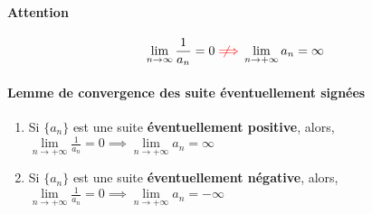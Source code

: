 \documentclass{report}
\newcommand{\notimplies}{%
  \mathrel{{\ooalign{\hidewidth$\not\phantom{=}$\hidewidth\cr$\implies$}}}}
\begin{document}
\begin{multicols*}{3}
    \paragraph{Attention}
        \begin{align*}
            \lim\limits_{n\to\infty  }\frac{1}{a_n} = 0 
            \textcolor{red}{\notimplies}
            \lim\limits_{n\to+\infty }a_n  = \infty
        \end{align*}    

    \paragraph{Lemme de convergence des suite éventuellement signées}



        \begin{enumerate}
            \item 
                Si $\{ a_n \}$ est une suite 
                \textbf{éventuellement positive}, 
                alors,  
                    $\lim\limits_{n\to+\infty }\frac{1}{a_n}  = 0 
                    \implies 
                    \lim\limits_{n\to+\infty }a_n  = \infty$
            \item                                 
                Si $\{ a_n \}$ est une suite 
                \textbf{éventuellement négative}, 
                alors,   
                    $\lim\limits_{n\to+\infty }\frac{1}{a_n}  = 0 
                    \implies 
                    \lim\limits_{n\to+\infty }a_n  = -\infty$
        \end{enumerate} 


 


\end{multicols*}
\end{document}
